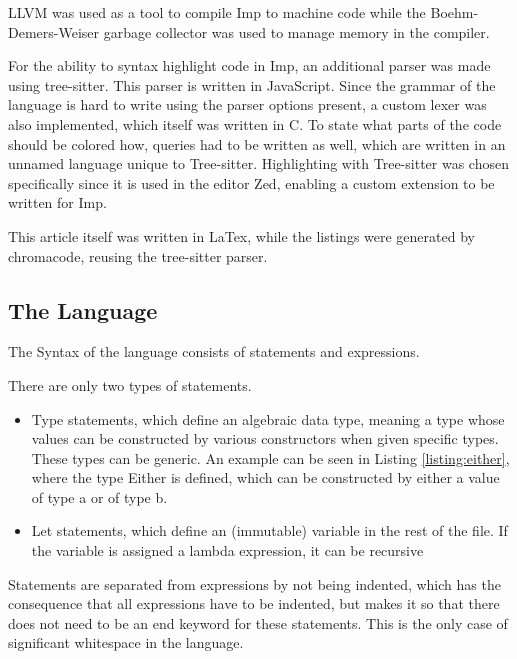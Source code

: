\documentclass[12pt]{article}
\newcommand{\importListing}[1]{
    \begin{minipage}{\linewidth}
    
    \end{minipage}
}
\begin{document}
LLVM was used as a tool to compile Imp to machine code while the
Boehm-Demers-Weiser garbage collector \autocite{GarbageCollector} was
used to manage memory in the compiler.

For the ability to syntax highlight code in Imp, an additional parser was made using tree-sitter.
This parser is written in JavaScript. Since the grammar of the language is hard to write using
the parser options present, a custom lexer was also implemented, which itself was written in C.
To state what parts of the code should be colored how, queries had to be written as well,
which are written in an unnamed language unique to Tree-sitter.
Highlighting with Tree-sitter was chosen specifically since it is used
in the editor Zed, enabling a custom extension to be written for Imp.

This article itself was written in LaTex, while the listings were generated
by chromacode\autocite{lebedaTomLebedaChroma_code2025}, reusing the tree-sitter parser.


\subsection{The Language}
\importListing{code/either.tex}

The Syntax of the language consists of statements and expressions.

There are only two types of statements.
\begin{itemize}
	\item Type statements, which define an algebraic data type,
	      meaning a type whose values can be constructed by various
	      constructors when given specific types.
	      These types can be generic.
	      An example can be seen in Listing \ref{listing:either}, where the type Either is defined,
	      which can be constructed by either a value of type a or of type b.
	\item Let statements, which define an (immutable) variable
	      in the rest of the file. If the variable is assigned a
	      lambda expression, it can be recursive
\end{itemize}
Statements are separated from expressions by not being indented,
which has the consequence that all expressions have to be indented,
but makes it so that there does not need to be an end keyword
for these statements.
This is the only case of significant whitespace in the language.
\end{document}
